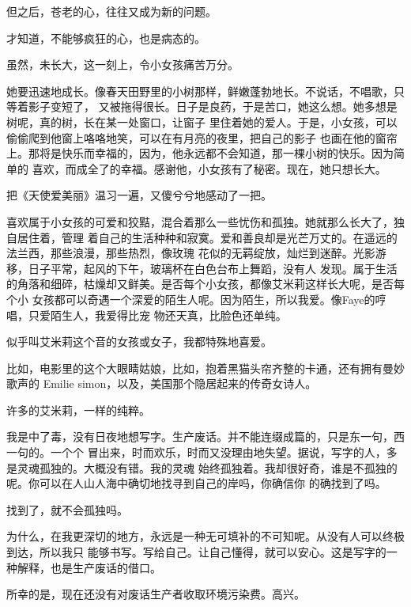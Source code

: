 		但之后，苍老的心，往往又成为新的问题。

		才知道，不能够疯狂的心，也是病态的。

		虽然，未长大，这一刻上，令小女孩痛苦万分。



		她要迅速地成长。像春天田野里的小树那样，鲜嫩蓬勃地长。不说话，不唱歌，只等着影子变短了，
	又被拖得很长。日子是良药，于是苦口，她这么想。她多想是树呢，真的树，长在某一处窗口，让窗子
	里住着她的爱人。于是，小女孩，可以偷偷爬到他窗上咯咯地笑，可以在有月亮的夜里，把自己的影子
	也画在他的窗帘上。那将是快乐而幸福的，因为，他永远都不会知道，那一棵小树的快乐。因为简单的
	喜欢，而成全了的幸福。感谢他，小女孩有了秘密。现在，她只想长大。



		把《天使爱美丽》温习一遍，又傻兮兮地感动了一把。

		喜欢属于小女孩的可爱和狡黠，混合着那么一些忧伤和孤独。她就那么长大了，独自居住着，管理
	着自己的生活种种和寂寞。爱和善良却是光芒万丈的。在遥远的法兰西，那些浪漫，那些热烈，像玫瑰
	花似的无羁绽放，灿烂到迷醉。光影游移，日子平常，起风的下午，玻璃杯在白色台布上舞蹈，没有人
	发现。属于生活的角落和细碎，枯燥却又鲜美。是否每个小女孩，都像艾米莉这样长大呢，是否每个小
	女孩都可以奇遇一个深爱的陌生人呢。因为陌生，所以我爱。像Faye的哼唱，只爱陌生人，我爱得比宠
	物还天真，比脸色还单纯。

		似乎叫艾米莉这个音的女孩或女子，我都特殊地喜爱。

		比如，电影里的这个大眼睛姑娘，比如，抱着黑猫头帘齐整的卡通，还有拥有曼妙歌声的 Emilie
	simon，以及，美国那个隐居起来的传奇女诗人。

		许多的艾米莉，一样的纯粹。



		我是中了毒，没有日夜地想写字。生产废话。并不能连缀成篇的，只是东一句，西一句的。一个个
	冒出来，时而欢乐，时而又没理由地失望。据说，写字的人，多是灵魂孤独的。大概没有错。我的灵魂
	始终孤独着。我却很好奇，谁是不孤独的呢。你可以在人山人海中确切地找寻到自己的岸吗，你确信你
	的确找到了吗。

		找到了，就不会孤独吗。

		为什么，在我更深切的地方，永远是一种无可填补的不可知呢。从没有人可以终极到达，所以我只
	能够书写。写给自己。让自己懂得，就可以安心。这是写字的一种解释，也是生产废话的借口。

		所幸的是，现在还没有对废话生产者收取环境污染费。高兴。



